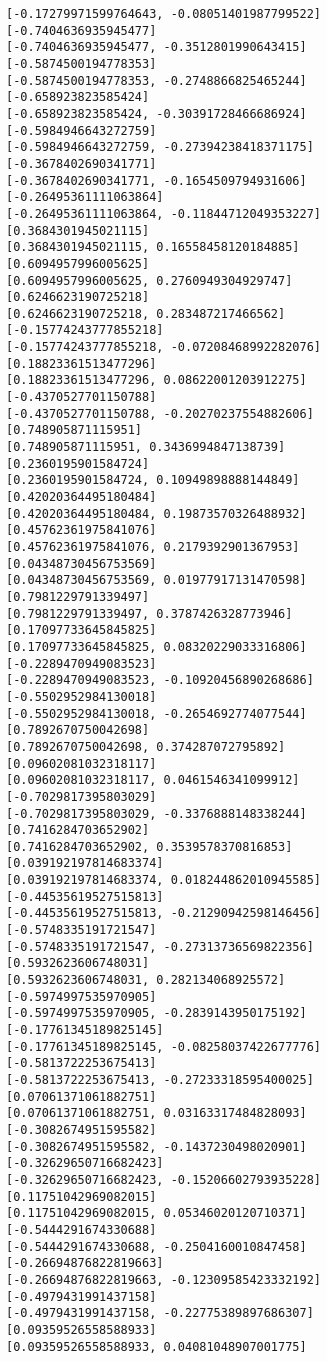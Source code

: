 \documentclass[11pt]{article}
\begin{document}
\begin{Verbatim}[commandchars=\\\{\}]
[-0.17279971599764643, -0.08051401987799522]
[-0.7404636935945477]
[-0.7404636935945477, -0.3512801990643415]
[-0.5874500194778353]
[-0.5874500194778353, -0.2748866825465244]
[-0.658923823585424]
[-0.658923823585424, -0.30391728466686924]
[-0.5984946643272759]
[-0.5984946643272759, -0.27394238418371175]
[-0.3678402690341771]
[-0.3678402690341771, -0.1654509794931606]
[-0.26495361111063864]
[-0.26495361111063864, -0.11844712049353227]
[0.3684301945021115]
[0.3684301945021115, 0.16558458120184885]
[0.6094957996005625]
[0.6094957996005625, 0.2760949304929747]
[0.6246623190725218]
[0.6246623190725218, 0.283487217466562]
[-0.15774243777855218]
[-0.15774243777855218, -0.07208468992282076]
[0.18823361513477296]
[0.18823361513477296, 0.08622001203912275]
[-0.4370527701150788]
[-0.4370527701150788, -0.20270237554882606]
[0.748905871115951]
[0.748905871115951, 0.3436994847138739]
[0.2360195901584724]
[0.2360195901584724, 0.10949898888144849]
[0.42020364495180484]
[0.42020364495180484, 0.19873570326488932]
[0.45762361975841076]
[0.45762361975841076, 0.2179392901367953]
[0.04348730456753569]
[0.04348730456753569, 0.01977917131470598]
[0.7981229791339497]
[0.7981229791339497, 0.3787426328773946]
[0.17097733645845825]
[0.17097733645845825, 0.08320229033316806]
[-0.2289470949083523]
[-0.2289470949083523, -0.10920456890268686]
[-0.5502952984130018]
[-0.5502952984130018, -0.2654692774077544]
[0.7892670750042698]
[0.7892670750042698, 0.374287072795892]
[0.09602081032318117]
[0.09602081032318117, 0.0461546341099912]
[-0.7029817395803029]
[-0.7029817395803029, -0.3376888148338244]
[0.7416284703652902]
[0.7416284703652902, 0.3539578370816853]
[0.039192197814683374]
[0.039192197814683374, 0.018244862010945585]
[-0.44535619527515813]
[-0.44535619527515813, -0.21290942598146456]
[-0.5748335191721547]
[-0.5748335191721547, -0.27313736569822356]
[0.5932623606748031]
[0.5932623606748031, 0.282134068925572]
[-0.5974997535970905]
[-0.5974997535970905, -0.2839143950175192]
[-0.17761345189825145]
[-0.17761345189825145, -0.08258037422677776]
[-0.5813722253675413]
[-0.5813722253675413, -0.27233318595400025]
[0.07061371061882751]
[0.07061371061882751, 0.03163317484828093]
[-0.3082674951595582]
[-0.3082674951595582, -0.1437230498020901]
[-0.32629650716682423]
[-0.32629650716682423, -0.15206602793935228]
[0.11751042969082015]
[0.11751042969082015, 0.05346020120710371]
[-0.5444291674330688]
[-0.5444291674330688, -0.2504160010847458]
[-0.26694876822819663]
[-0.26694876822819663, -0.12309585423332192]
[-0.4979431991437158]
[-0.4979431991437158, -0.22775389897686307]
[0.09359526558588933]
[0.09359526558588933, 0.04081048907001775]

\end{Verbatim}
\end{document}
